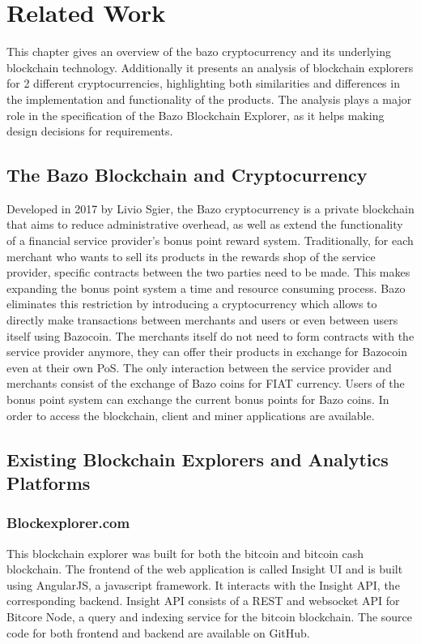 \chapter{Related Work}
This chapter gives an overview of the bazo cryptocurrency and its underlying blockchain technology. Additionally it presents an analysis of blockchain explorers for 2 different cryptocurrencies, highlighting both similarities and differences in the implementation and functionality of the products. The analysis plays a major role in the specification of the Bazo Blockchain Explorer, as it helps making design decisions for requirements.

\section{The Bazo Blockchain and Cryptocurrency}
Developed in 2017 by Livio Sgier, the Bazo cryptocurrency is a private blockchain that aims to reduce administrative overhead, as well as extend the functionality of a financial service provider's bonus point reward system. Traditionally, for each merchant who wants to sell its products in the rewards shop of the service provider, specific contracts between the two parties need to be made. This makes expanding the bonus point system a time and resource consuming process. Bazo eliminates this restriction by introducing a cryptocurrency which allows to directly make transactions between merchants and users or even between users itself using Bazocoin. The merchants itself do not need to form contracts with the service provider anymore, they can offer their products in exchange for Bazocoin even at their own PoS. The only interaction between the service provider and merchants consist of the exchange of Bazo coins for FIAT currency. Users of the bonus point system can exchange the current bonus points for Bazo coins. In order to access the blockchain, client and miner applications are available.

\section{Existing Blockchain Explorers and Analytics Platforms}
\subsection{Blockexplorer.com}
This blockchain explorer was built for both the bitcoin and bitcoin cash blockchain. The frontend of the web application is called Insight UI and is built using AngularJS, a javascript framework. It interacts with the Insight API, the corresponding backend. Insight API consists of a REST and websocket API for Bitcore Node, a query and indexing service for the bitcoin blockchain. The source code for both frontend and backend are available on GitHub.

